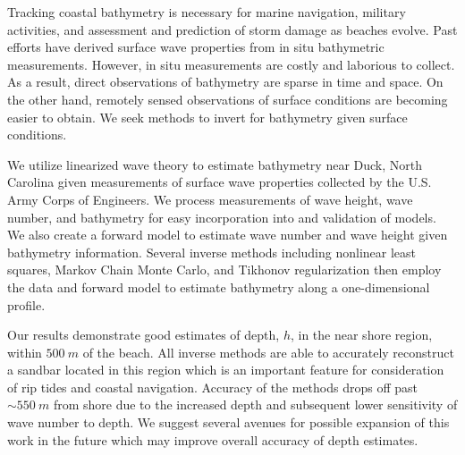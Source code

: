 Tracking coastal bathymetry is necessary for marine navigation, military activities, and assessment and prediction of storm damage as beaches evolve. Past efforts have derived surface wave properties from in situ bathymetric measurements. However, in situ measurements are costly and laborious to collect. As a result, direct observations of bathymetry are sparse in time and space. On the other hand, remotely sensed observations of surface conditions are becoming easier to obtain. We seek methods to invert for bathymetry given surface conditions. 

We utilize linearized wave theory to estimate bathymetry near Duck, North Carolina given measurements of surface wave properties collected by the U.S. Army Corps of Engineers. We process measurements of wave height, wave number, and bathymetry for easy incorporation into and validation of models. We also create a forward model to estimate wave number and wave height given bathymetry information. Several inverse methods including nonlinear least squares, Markov Chain Monte Carlo, and Tikhonov regularization then employ the data and forward model to estimate bathymetry along a one-dimensional profile.

Our results demonstrate good estimates of depth, $h$, in the near shore region, within $500~m$ of the beach. All inverse methods are able to accurately reconstruct a sandbar located in this region which is an important feature for consideration of rip tides and coastal navigation. Accuracy of the methods drops off past $\sim550~m$ from shore due to the increased depth and subsequent lower sensitivity of wave number to depth. We suggest several avenues for possible expansion of this work in the future which may improve overall accuracy of depth estimates.